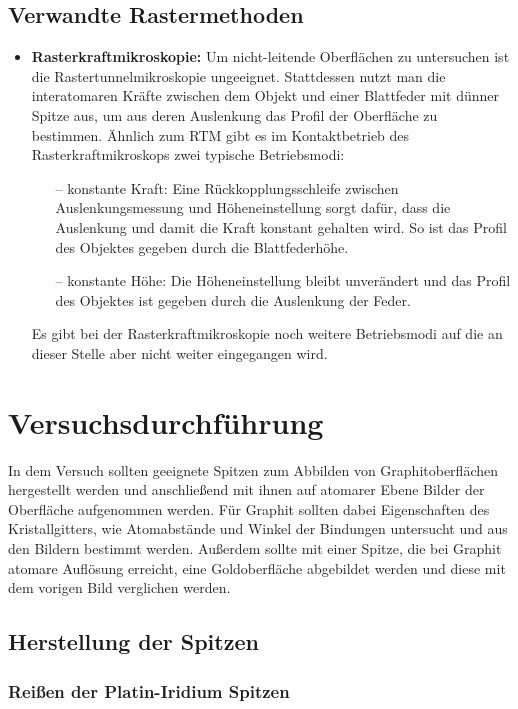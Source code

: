 \documentclass[10pt, a4paper]{article}
\begin{document}
\subsection{Verwandte Rastermethoden}
\begin{itemize}
  \item \textbf{Rasterkraftmikroskopie:} Um nicht-leitende Oberflächen zu untersuchen ist die Rastertunnelmikroskopie ungeeignet.
  Stattdessen nutzt man die interatomaren Kräfte zwischen dem Objekt und einer Blattfeder mit dünner Spitze aus, um aus deren Auslenkung das Profil der Oberfläche zu bestimmen.
  Ähnlich zum RTM gibt es im Kontaktbetrieb des Rasterkraftmikroskops zwei typische Betriebsmodi:
  \begin{itemize}
  \item[--] konstante Kraft: Eine Rückkopplungsschleife zwischen Auslenkungsmessung und Höheneinstellung sorgt dafür, dass die Auslenkung und damit die Kraft konstant gehalten wird.
  So ist das Profil des Objektes gegeben durch die Blattfederhöhe.
  \item[--] konstante Höhe: Die Höheneinstellung bleibt unverändert und das Profil des Objektes ist gegeben durch die Auslenkung der Feder.
  \end{itemize}
  Es gibt bei der Rasterkraftmikroskopie noch weitere Betriebsmodi auf die an dieser Stelle aber nicht weiter eingegangen wird.
\end{itemize}

\section{Versuchsdurchführung}
\label{sec:durchfuehrung}

In dem Versuch sollten geeignete Spitzen zum Abbilden von Graphitoberflächen hergestellt werden und anschließend mit ihnen auf atomarer Ebene Bilder der Oberfläche aufgenommen werden.
Für Graphit sollten dabei Eigenschaften des Kristallgitters, wie Atomabstände und Winkel der Bindungen untersucht und aus den Bildern bestimmt werden. 
Außerdem sollte mit einer Spitze, die bei Graphit atomare Auflösung erreicht, eine Goldoberfläche abgebildet werden und diese mit dem vorigen Bild verglichen werden.

\subsection{Herstellung der Spitzen}

\subsubsection{Reißen der Platin-Iridium Spitzen}
\end{document}
